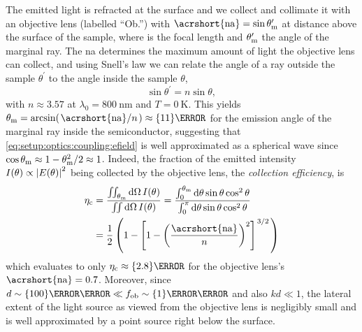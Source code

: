The emitted light is refracted at the surface and we collect and collimate it with an objective lens (labelled \enquote{Ob.}) with $\mr{\acrshort{na}}=\sin\theta^\prime_\mr{m}$ at distance \fob above the surface of the sample, where \fob is the focal length and $\theta^\prime_{\mathrm{m}}$ the angle of the marginal ray.
The \gls{na} determines the maximum amount of light the objective lens can collect, and using Snell's law we can relate the angle of a ray outside the sample $\theta^\prime$ to the angle inside the sample $\theta$,
\begin{equation}\label{eq:setup:optics:coupling:snell}
    \sin\theta^\prime = n\sin\theta,
\end{equation}
with $n\approx 3.57$ at $\lambda_0=\qty{800}{\nano\meter}$ and $T=\qty{0}{\kelvin}$.
This yields $\theta_{\mr{m}} = \arcsin(\flatfrac{\mr{\acrshort{na}}}{n}) \approx\qty{11}{\degree}$ for the emission angle of the marginal ray inside the semiconductor, suggesting that \cref{eq:setup:optics:coupling:efield} is well approximated as a spherical wave since $\cos\theta_{\mathrm{m}}\approx 1-\theta_{\mathrm{m}}^2/2\approx 1$.
Indeed, the fraction of the emitted intensity $I(\theta)\propto\abs{E(\theta)}^2$ being collected by the objective lens, the \emph{collection efficiency}, is
\begin{equation}\label{eq:setup:optics:coupling:efficiency:collection}
    \begin{split}
        \eta_{\mr{c}} &= \frac{\iint_{\theta_{\mr{m}}}\dd{\Omega} I(\theta)}{\iint\dd{\Omega} I(\theta)}
                      = \frac{\int_{0}^{\theta_{\mr{m}}}\dd{\theta}\sin\theta\cos^2\theta}{\int_{0}^{\pi}\dd{\theta}\sin\theta\cos^2\theta} \\
                      &= \frac{1}{2}\left(1 - \left[1 - \left(\frac{\mr{\acrshort{na}}}{n}\right)^2\right]^{\flatfrac{3}{2}}\right)
    \end{split}
\end{equation}
which evaluates to only $\eta_{\mr{c}}\approx\qty{2.8}{\percent}$ for the objective lens's $\mr{\acrshort{na}}=\num{0.7}$.
Moreover, since $d\sim\qty{100}{\nano\meter}\ll\fob\sim\qty{1}{\milli\meter}$ and also $kd\ll 1$, the lateral extent of the light source as viewed from the objective lens is negligibly small and is well approximated by a point source right below the surface.

